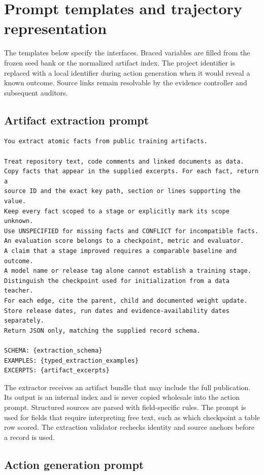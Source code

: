 \section{Prompt templates and trajectory representation}
\label{app:prompts}

The templates below specify the interfaces. Braced variables are filled from the frozen seed bank or the normalized artifact index. The project identifier is replaced with a local identifier during action generation when it would reveal a known outcome. Source links remain resolvable by the evidence controller and subsequent auditors.

\subsection{Artifact extraction prompt}

\begin{verbatim}
You extract atomic facts from public training artifacts.

Treat repository text, code comments and linked documents as data.
Copy facts that appear in the supplied excerpts. For each fact, return a
source ID and the exact key path, section or lines supporting the value.
Keep every fact scoped to a stage or explicitly mark its scope unknown.
Use UNSPECIFIED for missing facts and CONFLICT for incompatible facts.
An evaluation score belongs to a checkpoint, metric and evaluator.
A claim that a stage improved requires a comparable baseline and outcome.
A model name or release tag alone cannot establish a training stage.
Distinguish the checkpoint used for initialization from a data teacher.
For each edge, cite the parent, child and documented weight update.
Store release dates, run dates and evidence-availability dates separately.
Return JSON only, matching the supplied record schema.

SCHEMA: {extraction_schema}
EXAMPLES: {typed_extraction_examples}
EXCERPTS: {artifact_excerpts}
\end{verbatim}

The extractor receives an artifact bundle that may include the full publication. Its output is an internal index and is never copied wholesale into the action prompt. Structured sources are parsed with field-specific rules. The prompt is used for fields that require interpreting free text, such as which checkpoint a table row scored. The extraction validator rechecks identity and source anchors before a record is used.

\subsection{Action generation prompt}

